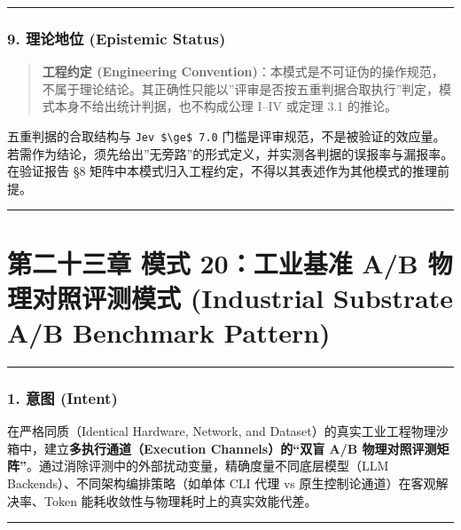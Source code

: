\documentclass[
]{ctexart}
\renewcommand{\_}{\discretionary{}{}{\textunderscore}}
\let\oldsection\section
\renewcommand{\section}{\clearpage\oldsection}
\begin{document}
\begin{center}\rule{0.5\linewidth}{0.5pt}\end{center}

\subsubsection{9. 理论地位 (Epistemic
Status)}\label{ux7406ux8bbaux5730ux4f4d-epistemic-status-3}

\begin{quote}
\textbf{工程约定 (Engineering
Convention)}：本模式是不可证伪的操作规范，不属于理论结论。其正确性只能以''评审是否按五重判据合取执行''判定，模式本身不给出统计判据，也不构成公理
I--IV 或定理 3.1 的推论。
\end{quote}

五重判据的合取结构与 \texttt{Jev\ \$\textbackslash{}ge\$\ 7.0}
门槛是评审规范，不是被验证的效应量。若需作为结论，须先给出''无旁路''的形式定义，并实测各判据的误报率与漏报率。在验证报告
§8 矩阵中本模式归入工程约定，不得以其表述作为其他模式的推理前提。

\begin{center}\rule{0.5\linewidth}{0.5pt}\end{center}

\section{第二十三章 模式 20：工业基准 A/B 物理对照评测模式 (Industrial Substrate
A/B Benchmark
Pattern)}\label{ux6a21ux5f0f-20ux5de5ux4e1aux57faux51c6-ab-ux7269ux7406ux5bf9ux7167ux8bc4ux6d4bux6a21ux5f0f-industrial-substrate-ab-benchmark-pattern}

\begin{center}\rule{0.5\linewidth}{0.5pt}\end{center}

\subsubsection{1. 意图 (Intent)}\label{ux610fux56fe-intent-19}

在严格同质（Identical Hardware, Network, and
Dataset）的真实工业工程物理沙箱中，建立\textbf{多执行通道（Execution
Channels）的``双盲 A/B
物理对照评测矩阵''}。通过消除评测中的外部扰动变量，精确度量不同底层模型（LLM
Backends）、不同架构编排策略（如单体 CLI 代理 vs
原生控制论通道）在客观解决率、Token
能耗收敛性与物理耗时上的真实效能代差。

\begin{center}\rule{0.5\linewidth}{0.5pt}\end{center}
\end{document}
